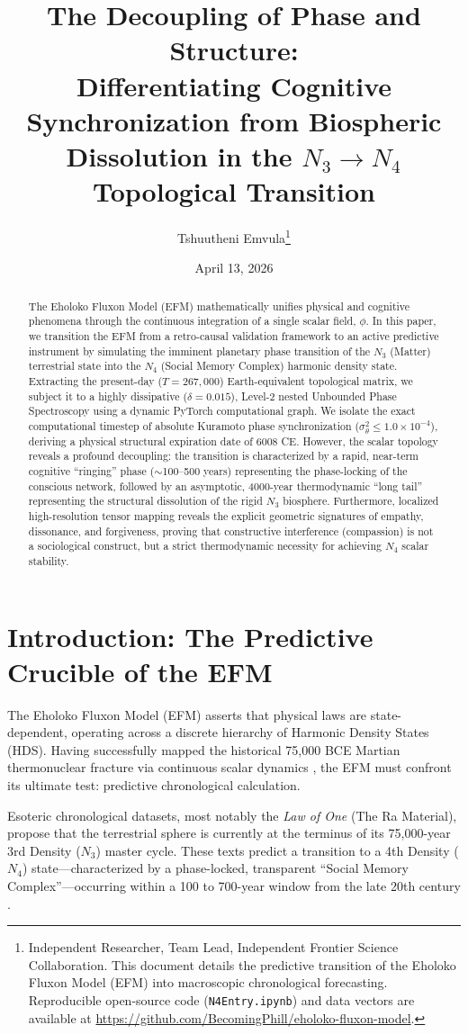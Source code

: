 \documentclass[11pt, twoside]{article}
\title{The Decoupling of Phase and Structure: \\ \Large Differentiating Cognitive Synchronization from Biospheric Dissolution in the $N_3 \to N_4$ Topological Transition}
\author{Tshuutheni Emvula\thanks{Independent Researcher, Team Lead, Independent Frontier Science Collaboration. This document details the predictive transition of the Eholoko Fluxon Model (EFM) into macroscopic chronological forecasting. Reproducible open-source code (\texttt{N4Entry.ipynb}) and data vectors are available at \url{https://github.com/BecomingPhill/eholoko-fluxon-model}.}}
\date{April 13, 2026}
\begin{document}
\maketitle
\thispagestyle{empty}

\begin{abstract}
The Eholoko Fluxon Model (EFM) mathematically unifies physical and cognitive phenomena through the continuous integration of a single scalar field, $\phi$. In this paper, we transition the EFM from a retro-causal validation framework to an active predictive instrument by simulating the imminent planetary phase transition of the $N_3$ (Matter) terrestrial state into the $N_4$ (Social Memory Complex) harmonic density state. Extracting the present-day ($T=267,000$) Earth-equivalent topological matrix, we subject it to a highly dissipative ($\delta=0.015$), Level-2 nested Unbounded Phase Spectroscopy using a dynamic PyTorch computational graph. We isolate the exact computational timestep of absolute Kuramoto phase synchronization ($\sigma^2_{\theta} \le 1.0 \times 10^{-4}$), deriving a physical structural expiration date of 6008 CE. However, the scalar topology reveals a profound decoupling: the transition is characterized by a rapid, near-term cognitive ``ringing'' phase ($\sim$100--500 years) representing the phase-locking of the conscious network, followed by an asymptotic, 4000-year thermodynamic ``long tail'' representing the structural dissolution of the rigid $N_3$ biosphere. Furthermore, localized high-resolution tensor mapping reveals the explicit geometric signatures of empathy, dissonance, and forgiveness, proving that constructive interference (compassion) is not a sociological construct, but a strict thermodynamic necessity for achieving $N_4$ scalar stability.
\end{abstract}

\clearpage
\tableofcontents
\clearpage

\section{Introduction: The Predictive Crucible of the EFM}
The Eholoko Fluxon Model (EFM) asserts that physical laws are state-dependent, operating across a discrete hierarchy of Harmonic Density States (HDS). Having successfully mapped the historical 75,000 BCE Martian thermonuclear fracture via continuous scalar dynamics \citep{emvula2026chronology}, the EFM must confront its ultimate test: predictive chronological calculation.

Esoteric chronological datasets, most notably the \textit{Law of One} (The Ra Material), propose that the terrestrial sphere is currently at the terminus of its 75,000-year 3rd Density ($N_3$) master cycle. These texts predict a transition to a 4th Density ($N_4$) state---characterized by a phase-locked, transparent ``Social Memory Complex''---occurring within a 100 to 700-year window from the late 20th century \citep{elkins1984}. 
\end{document}
